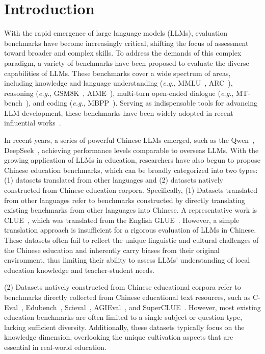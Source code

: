 \section{Introduction}

With the rapid emergence of large language models (LLMs), evaluation benchmarks have become increasingly critical, shifting the focus of assessment toward broader and complex skills. To address the demands of this complex paradigm, a variety of benchmarks have been proposed to evaluate the diverse capabilities of LLMs. These benchmarks cover a wide spectrum of areas, including knowledge and language understanding (\textit{e.g.}, MMLU~\citep{hendrycks2021measuring}, ARC~\citep{allenai:arc}), reasoning (\textit{e.g.}, GSM8K~\citep{cobbe2021gsm8k}, AIME~\citep{patel2024aime}), multi-turn open-ended dialogue (\textit{e.g.}, MT-bench~\citep{bai2024mt}), and coding (\textit{e.g.}, MBPP~\citep{austin2021program}). Serving as indispensable tools for advancing LLM development, these benchmarks have been widely adopted in recent influential works~\citep{hurst2024gpt-4o,liu2024deepseek-v2,seed2025seed-oss,comanici2025gemini,taylor2022galactica,touvron2023llama,openai2023gpt4,hoffmann2022training}.

In recent years, a series of powerful Chinese LLMs emerged, such as the Qwen~\citep{qwen2.5,yang2025qwen3}, DeepSeek~\citep{liu2024deepseek-v2,guo2025deepseek,liu2024deepseek-v3}, achieving performance levels comparable to overseas LLMs. With the growing application of LLMs in education, researchers have also begun to propose Chinese education benchmarks, which can be broadly categorized into two types: \textcolor{blue2}{(1) datasets translated from other languages} and \textcolor{myorange}{(2) datasets natively constructed from Chinese education corpora}. Specifically, \textcolor{blue2}{(1) Datasets translated from other languages} refer to benchmarks constructed by directly translating existing benchmarks from other languages into Chinese. A representative work is CLUE~\citep{xu-etal-2020-clue}, which was translated from the English GLUE~\citep{wangglue}.
However, a simple translation approach is insufficient for a rigorous evaluation of LLMs in Chinese. These datasets often fail to reflect the unique linguistic and cultural challenges of the Chinese education and inherently carry biases from their original environment, thus limiting their ability to assess LLMs’ understanding of local education knowledge and teacher-student needs.

\textcolor{myorange}{(2) Datasets natively constructed from Chinese educational corpora} refer to benchmarks directly collected from Chinese educational text resources, such as C-Eval~\citep{huang2023ceval}, Edubench~\citep{xu2025edubench}, Scieval~\citep{sun2024scieval}, AGIEval~\citep{zhong2023agieval}, and SuperCLUE~\citep{xu2023superclue}. However, most existing education benchmarks are often limited to a single subject or question type, lacking sufficient diversity. Additionally, these datasets typically focus on the knowledge dimension, overlooking the unique cultivation aspects that are essential in real-world education. 

